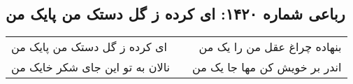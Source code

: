 \begin{center}
\section*{رباعی شماره ۱۴۲۰: ای کرده ز گل دستک من پایک من}
\label{sec:1420}
\begin{longtable}{l p{0.5cm} r}
ای کرده ز گل دستک من پایک من
&&
بنهاده چراغ عقل من را یک من
\\
نالان به تو این جای شکر خایک من
&&
اندر بر خویش کن مها جا یک من
\\
\end{longtable}
\end{center}
